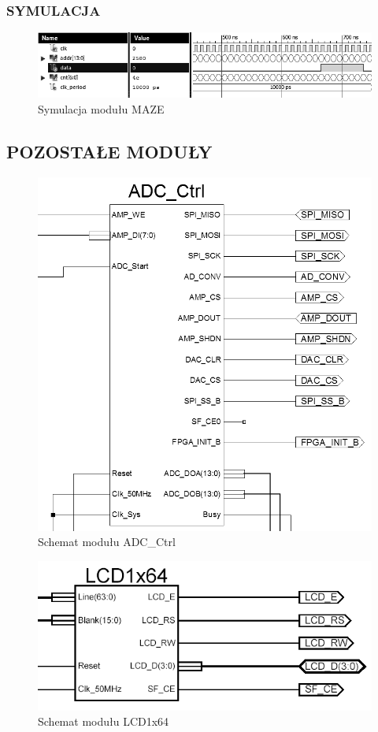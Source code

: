\documentclass[11pt]{article}
\begin{document}
\subsubsection{SYMULACJA}

\begin{figure}[H]
\center
\includegraphics[scale=.7]{maze_test.png}
\caption{Symulacja modułu MAZE}
\end{figure}

\subsection{POZOSTAŁE MODUŁY}

\begin{figure}[H]
\centering
\includegraphics[scale=.5]{ADC_Ctrl.PNG}
\caption{Schemat modułu ADC\_Ctrl}
\end{figure}

\begin{figure}[H]
\centering
\includegraphics[scale=.5]{LCD1x64.PNG}
\caption{Schemat modułu LCD1x64}
\end{figure}
\end{document}
